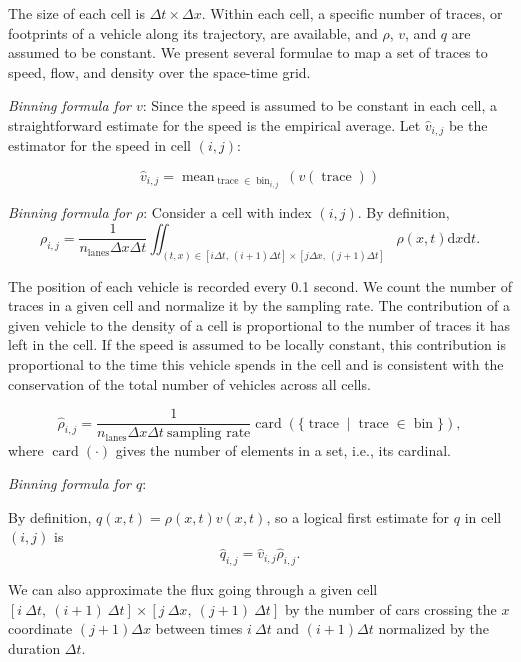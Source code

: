 \documentclass[preprint]{elsarticle}
\DeclareMathOperator{\card}{card}
\DeclareMathOperator{\trc}{trace}
\DeclareMathOperator{\mean}{mean}
\DeclareMathOperator{\bin}{bin}
\DeclareMathOperator{\lns}{lanes}
\begin{document}
The size of each cell is $\Delta t\times\Delta x$. Within each cell, a specific number of traces, or footprints of a vehicle along its trajectory, are available, and $\rho$, $v$, and $q$ are assumed to be constant. We present several formulae to map a set of traces to speed, flow, and density over the space-time grid. 

\textit{Binning formula for $v$}: Since the speed is assumed to be constant in each cell, a straightforward estimate for the speed is the empirical average. Let $\widehat{v}_{i,j}$ be the estimator for the speed in cell $(i,j)$:

\begin{equation}
\widehat{v}_{i,j}=\mean_{\trc \in \bin_{i,j}}(v(\trc))
\end{equation}

\textit{Binning formula for $\rho$}: Consider a cell with index $(i,j)$. By definition, 
\begin{equation}
\rho_{i,j}=\frac{1}{n_{\lns}\Delta x\Delta t}\iint_{\left(t,x\right)\in [i\Delta t, \,(i+1)\Delta t] \times [j\Delta x,\,(j+1)\Delta t]}\rho(x,t) \text{d}x \text{d}t.
\end{equation}

The position of each vehicle is recorded every 0.1 second. We count the number of traces in a given cell and normalize it by the sampling rate. The contribution of a given vehicle to the density of a cell is proportional to the
number of traces it has left in the cell. If the speed is assumed to be locally constant, this contribution is proportional to the time this vehicle spends in the cell and is consistent with the conservation of the total number of vehicles across all cells.

\begin{equation}
\widehat{\rho}_{i,j}=\frac{1}{n_{\lns} \Delta x \Delta t \: \text{sampling rate}}\card ( \{ \trc \mid \trc \in \bin \} ),
\end{equation}
where $\card (\cdot)$ gives the number of elements in a set, i.e., its cardinal.

\textit{Binning formula for $q$}:

By definition, $q\left(x,t\right)=\rho\left(x,t\right)v\left(x,t\right)$, so a logical first estimate for $q$ in cell $(i,j)$ is 
\begin{equation}
\widehat{q}_{i,j}=\widehat{v}_{i,j}\widehat{\rho}_{i,j}.
\end{equation}

We can also approximate the flux going through a given cell $\left[i\:\Delta t,\:\left(i+1\right)\:\Delta t\right]\times\left[j\:\Delta x,\:\left(j+1\right)\:\Delta t\right]$
by the number of cars crossing the $x$ coordinate $\left(j+1\right)\Delta x$
between times $i\:\Delta t$ and $\left(i+1\right)\Delta t$ normalized
by the duration $\Delta t$.
\end{document}
